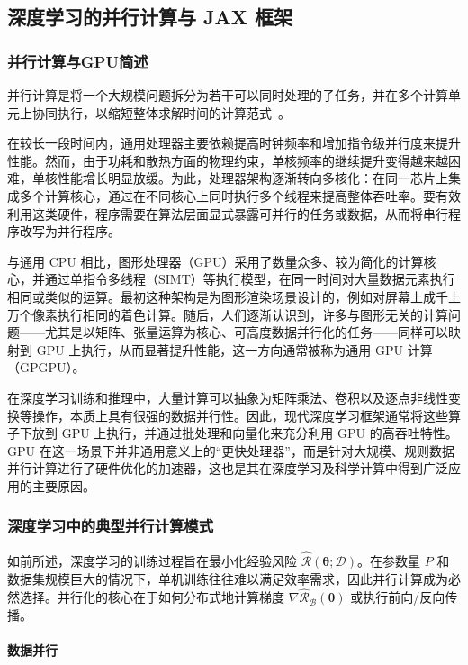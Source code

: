 \subsection{深度学习的并行计算与 JAX 框架}

\subsubsection{并行计算与GPU简述}

并行计算是将一个大规模问题拆分为若干可以同时处理的子任务，并在多个计算单元上协同执行，以缩短整体求解时间的计算范式~\cite{buck2004brook,dean2012large}。

在较长一段时间内，通用处理器主要依赖提高时钟频率和增加指令级并行度来提升性能。然而，由于功耗和散热方面的物理约束，单核频率的继续提升变得越来越困难，单核性能增长明显放缓。为此，处理器架构逐渐转向多核化：在同一芯片上集成多个计算核心，通过在不同核心上同时执行多个线程来提高整体吞吐率。要有效利用这类硬件，程序需要在算法层面显式暴露可并行的任务或数据，从而将串行程序改写为并行程序。

与通用 CPU 相比，图形处理器（GPU）采用了数量众多、较为简化的计算核心，并通过单指令多线程（SIMT）等执行模型，在同一时间对大量数据元素执行相同或类似的运算。最初这种架构是为图形渲染场景设计的，例如对屏幕上成千上万个像素执行相同的着色计算。随后，人们逐渐认识到，许多与图形无关的计算问题——尤其是以矩阵、张量运算为核心、可高度数据并行化的任务——同样可以映射到 GPU 上执行，从而显著提升性能，这一方向通常被称为通用 GPU 计算（GPGPU）。

在深度学习训练和推理中，大量计算可以抽象为矩阵乘法、卷积以及逐点非线性变换等操作，本质上具有很强的数据并行性。因此，现代深度学习框架通常将这些算子下放到 GPU 上执行，并通过批处理和向量化来充分利用 GPU 的高吞吐特性。GPU 在这一场景下并非通用意义上的“更快处理器”，而是针对大规模、规则数据并行计算进行了硬件优化的加速器，这也是其在深度学习及科学计算中得到广泛应用的主要原因。

\subsubsection{深度学习中的典型并行计算模式}

如前所述，深度学习的训练过程旨在最小化经验风险 $\hat{\mathcal{R}}(\bm{\theta}; \mathcal{D})$。在参数量 $P$ 和数据集规模巨大的情况下，单机训练往往难以满足效率需求，因此并行计算成为必然选择。并行化的核心在于如何分布式地计算梯度 $\nabla \hat{\mathcal{R}}_{\mathcal{B}}(\bm{\theta})$ 或执行前向/反向传播。

\paragraph{数据并行}

